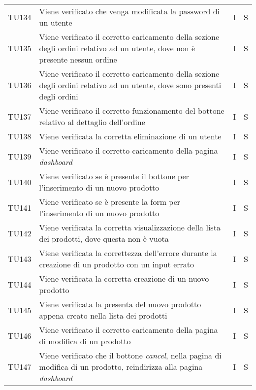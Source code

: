 {\begin{longtable}{C{2cm} C{9.6cm} C{1.5cm} C{1cm}}
TU134 & Viene verificato che venga modificata la password di un utente & I & S\\

TU135 & Viene verificato il corretto caricamento della sezione degli ordini relativo ad un utente, dove non è presente nessun ordine & I & S\\

TU136 & Viene verificato il corretto caricamento della sezione degli ordini relativo ad un utente, dove sono presenti degli ordini & I & S\\

TU137 & Viene verificato il corretto funzionamento del bottone relativo al dettaglio dell'ordine & I & S\\

TU138 & Viene verificata la corretta eliminazione di un utente & I & S\\

TU139 & Viene verificato il corretto caricamento della pagina \textit{dashboard} & I & S\\

TU140 & Viene verificato se è presente il bottone per l'inserimento di un nuovo prodotto & I & S\\

TU141 & Viene verificato se è presente la form per l'inserimento di un nuovo prodotto & I & S\\

TU142 & Viene verificata la corretta visualizzazione della lista dei prodotti, dove questa non è vuota & I & S\\

TU143 & Viene verificata la correttezza dell'errore durante la creazione di un prodotto con un input errato & I & S\\

TU144 & Viene verificata la corretta creazione di un nuovo prodotto  & I & S\\

TU145 & Viene verificata la presenta del nuovo prodotto appena creato nella lista dei prodotti & I & S\\

TU146 & Viene verificato il corretto caricamento della pagina di modifica di un prodotto & I & S\\

TU147 & Viene verificato che il bottone \textit{cancel}, nella pagina di modifica di un prodotto, reindirizza alla pagina \textit{dashboard} & I & S\\


\end{longtable}}
